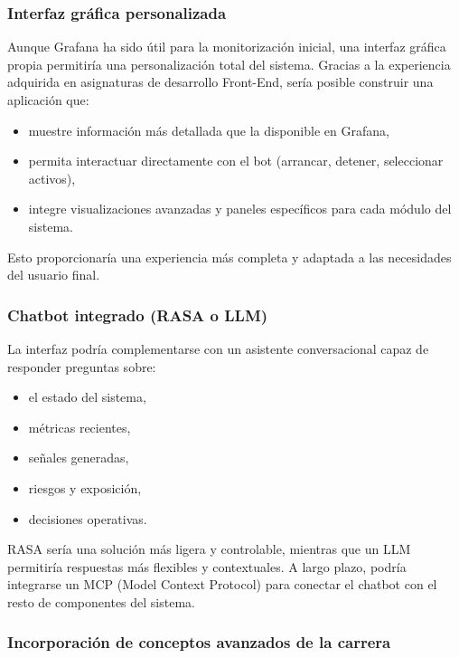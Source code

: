 \subsubsection{Interfaz gráfica personalizada}

Aunque Grafana ha sido útil para la monitorización inicial, una interfaz gráfica propia permitiría una personalización total del sistema. Gracias a la
experiencia adquirida en asignaturas de desarrollo Front-End, sería posible construir una aplicación que:

\begin{itemize}
    \item muestre información más detallada que la disponible en Grafana,
    \item permita interactuar directamente con el bot (arrancar, detener, seleccionar activos),
    \item integre visualizaciones avanzadas y paneles específicos para cada módulo del sistema.
\end{itemize}

Esto proporcionaría una experiencia más completa y adaptada a las necesidades del usuario final.

\subsubsection{Chatbot integrado (RASA o LLM)}

La interfaz podría complementarse con un asistente conversacional capaz de responder preguntas sobre:

\begin{itemize}
    \item el estado del sistema,
    \item métricas recientes,
    \item señales generadas,
    \item riesgos y exposición,
    \item decisiones operativas.
\end{itemize}

RASA sería una solución más ligera y controlable, mientras que un LLM permitiría respuestas más flexibles y contextuales. A largo plazo, podría
integrarse un MCP (Model Context Protocol) para conectar el chatbot con el resto de componentes del sistema.

\subsubsection{Incorporación de conceptos avanzados de la carrera}

